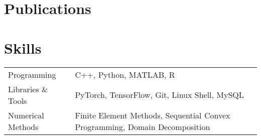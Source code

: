 \documentclass[a4paper,12pt]{article}
\begin{document}
\section{Publications}
\begin{refsection}
\nocite{*}
\printbibliography[heading=none]
\end{refsection}

\section{Skills}
\begin{tabularx}{\linewidth}{@{}l X@{}}
Programming &  \normalsize{C++, Python, MATLAB, R}\\
Libraries \& Tools  &  \normalsize{PyTorch, TensorFlow, Git, Linux Shell, MySQL}\\
Numerical Methods & Finite Element Methods, Sequential Convex Programming, Domain Decomposition  
\end{tabularx}

\vfill
{}
\end{document}
